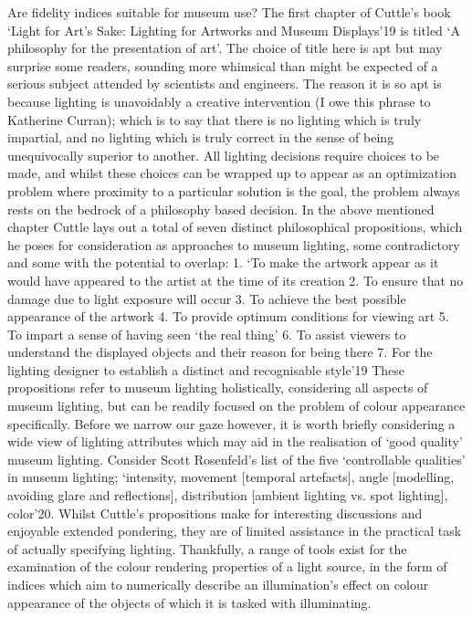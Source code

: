 Are fidelity indices suitable for museum use? 
The first chapter of Cuttle's book `Light for Art's Sake: Lighting for Artworks and Museum Displays'19 is titled `A philosophy for the presentation of art'. The choice of title here is apt but may surprise some readers, sounding more whimsical than might be expected of a serious subject attended by scientists and engineers. The reason it is so apt is because lighting is unavoidably a creative intervention (I owe this phrase to Katherine Curran); which is to say that there is no lighting which is truly impartial, and no lighting which is truly correct in the sense of being unequivocally superior to another. All lighting decisions require choices to be made, and whilst these choices can be wrapped up to appear as an optimization problem where proximity to a particular solution is the goal, the problem always rests on the bedrock of a philosophy based decision.
In the above mentioned chapter Cuttle lays out a total of seven distinct philosophical propositions, which he poses for consideration as approaches to museum lighting, some contradictory and some with the potential to overlap:
1.	`To make the artwork appear as it would have appeared to the artist at the time of its creation
2.	To ensure that no damage due to light exposure will occur
3.	To achieve the best possible appearance of the artwork
4.	To provide optimum conditions for viewing art
5.	To impart a sense of having seen `the real thing'
6.	To assist viewers to understand the displayed objects and their reason for being there
7.	For the lighting designer to establish a distinct and recognisable style'19 
These propositions refer to museum lighting holistically, considering all aspects of museum lighting, but can be readily focused on the problem of colour appearance specifically. Before we narrow our gaze however, it is worth briefly considering a wide view of lighting attributes which may aid in the realisation of `good quality' museum lighting. Consider Scott Rosenfeld's list of the five `controllable qualities' in museum lighting; `intensity, movement [temporal artefacts], angle [modelling, avoiding glare and reflections], distribution [ambient lighting vs. spot lighting], color'20.
Whilst Cuttle's propositions make for interesting discussions and enjoyable extended pondering, they are of limited assistance in the practical task of actually specifying lighting. Thankfully, a range of tools exist for the examination of the colour rendering properties of a light source, in the form of indices which aim to numerically describe an illumination's effect on colour appearance of the objects of which it is tasked with illuminating.
